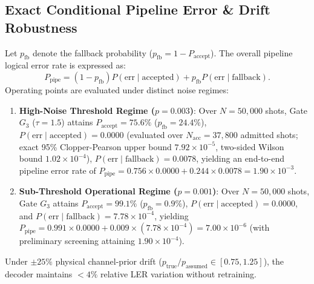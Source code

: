 \documentclass[journal]{IEEEtran}
\begin{document}
\subsection{Exact Conditional Pipeline Error \& Drift Robustness}
Let $p_{\text{fb}}$ denote the fallback probability ($p_{\text{fb}} = 1 - P_{\text{accept}}$). The overall pipeline logical error rate is expressed as:
\begin{equation}
    P_{\text{pipe}} = (1 - p_{\text{fb}}) P(\text{err} \mid \text{accepted}) + p_{\text{fb}} P(\text{err} \mid \text{fallback}).
\end{equation}
Operating points are evaluated under distinct noise regimes:
\begin{enumerate}
    \item \textbf{High-Noise Threshold Regime ($p = 0.003$)}: Over $N = 50,000$ shots, Gate $G_3$ ($\tau = 1.5$) attains $P_{\text{accept}} = 75.6\%$ ($p_{\text{fb}} = 24.4\%$), $P(\text{err} \mid \text{accepted}) = 0.0000$ (evaluated over $N_{\text{acc}} = 37,800$ admitted shots; exact 95\% Clopper-Pearson upper bound $7.92 \times 10^{-5}$, two-sided Wilson bound $1.02 \times 10^{-4}$), $P(\text{err} \mid \text{fallback}) = 0.0078$, yielding an end-to-end pipeline error rate of $P_{\text{pipe}} = 0.756 \times 0.0000 + 0.244 \times 0.0078 = 1.90 \times 10^{-3}$.
    \item \textbf{Sub-Threshold Operational Regime ($p = 0.001$)}: Over $N = 50,000$ shots, Gate $G_3$ attains $P_{\text{accept}} = 99.1\%$ ($p_{\text{fb}} = 0.9\%$), $P(\text{err} \mid \text{accepted}) = 0.0000$, and $P(\text{err} \mid \text{fallback}) = 7.78 \times 10^{-4}$, yielding $P_{\text{pipe}} = 0.991 \times 0.0000 + 0.009 \times (7.78 \times 10^{-4}) = 7.00 \times 10^{-6}$ (with preliminary screening attaining $1.90 \times 10^{-4}$).
\end{enumerate}
Under $\pm 25\%$ physical channel-prior drift ($p_{\text{true}} / p_{\text{assumed}} \in [0.75, 1.25]$), the decoder maintains $< 4\%$ relative LER variation without retraining.
\end{document}
